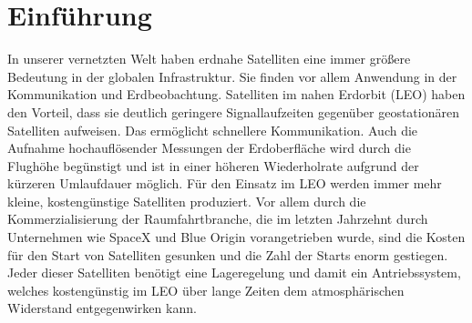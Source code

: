 \chapter{Einführung}
In unserer vernetzten Welt haben erdnahe Satelliten eine immer größere Bedeutung in der globalen Infrastruktur. Sie finden vor allem Anwendung in der Kommunikation und Erdbeobachtung. Satelliten im nahen Erdorbit (LEO) haben den Vorteil, dass sie deutlich geringere Signallaufzeiten gegenüber geostationären Satelliten aufweisen. Das ermöglicht schnellere Kommunikation. Auch die Aufnahme hochauflösender Messungen der Erdoberfläche wird durch die Flughöhe begünstigt und ist in einer höheren Wiederholrate aufgrund der kürzeren Umlaufdauer möglich. Für den Einsatz im LEO werden immer mehr kleine, kostengünstige Satelliten produziert. Vor allem durch die Kommerzialisierung der Raumfahrtbranche, die im letzten Jahrzehnt durch Unternehmen wie SpaceX und Blue Origin vorangetrieben wurde, sind die Kosten für den Start von Satelliten gesunken und die Zahl der Starts enorm gestiegen. Jeder dieser Satelliten benötigt eine Lageregelung und damit ein Antriebssystem, welches kostengünstig im LEO über lange Zeiten dem atmosphärischen Widerstand entgegenwirken kann.

